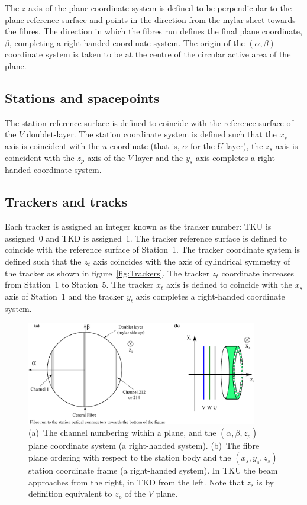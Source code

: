  The $z$ axis of the plane coordinate system is defined to be perpendicular to the plane reference surface and points in the direction from the mylar sheet towards the fibres. The direction in which the fibres run defines the final plane coordinate, $\beta$, completing a right-handed coordinate system. The origin of the $(\alpha, \beta)$ coordinate system is taken to be at the centre of the circular active area of the plane.

  \subsection{Stations and spacepoints}
  The station reference surface is defined to coincide with the reference surface of the $V$ doublet-layer. The station coordinate system is defined such that the $x_s$ axis is coincident with the $u$ coordinate (that is, $\alpha$ for the $U$ layer), the $z_s$ axis is coincident with the $z_p$ axis of the $V$ layer and the $y_s$ axis completes a right-handed coordinate system.

  \subsection{Trackers and tracks}
  Each tracker is assigned an integer known as the tracker number: TKU is assigned~0 and TKD is assigned~1. The tracker reference surface is defined to coincide with the reference surface of Station~1. The tracker coordinate system is defined such that the $z_t$ axis coincides with the axis of cylindrical symmetry of the tracker as shown in figure~\ref{fig:Trackers}. The tracker $z_t$ coordinate increases from Station~1 to Station~5. The tracker $x_t$ axis is defined to coincide with the $x_s$ axis of Station~1 and the tracker $y_t$ axis completes a right-handed coordinate system. 
  
  \begin{figure}[bt]
    \begin{center}
      \includegraphics[width=0.9\textwidth]{02-CoordinateSystems/PlaneCoordinatesAndNumbering.pdf}
      \caption{\label{fig:DoubletLayerOrder} (a)~The channel numbering within a plane, and the $(\alpha, \beta, z_p)$ plane coordinate system (a right-handed system).  (b)~The fibre plane ordering with respect to the station body and the $(x_s, y_s, z_s)$ station coordinate frame (a right-handed system).  In TKU the beam approaches from the right, in TKD from the left. Note that $z_s$ is by definition equivalent to $z_p$ of the $V$ plane.}
    \end{center}
  \end{figure}

